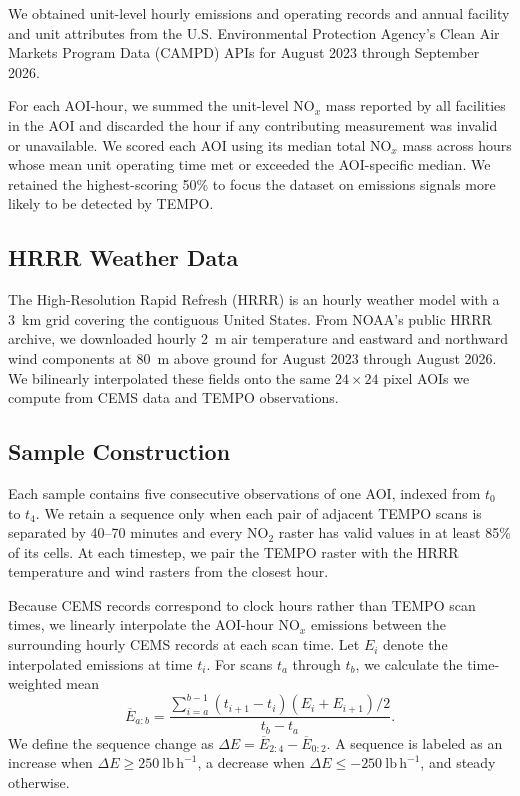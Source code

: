 \documentclass[sigconf,nonacm]{acmart}
\newcommand{\NOx}{NO$_x$}
\begin{document}
We obtained unit-level hourly emissions and operating records and annual
facility and unit attributes from the U.S. Environmental Protection Agency's
Clean Air Markets Program Data (CAMPD) APIs for August 2023 through September
2026.

For each AOI-hour, we summed the unit-level \NOx{} mass reported by all
facilities in the AOI and discarded the hour if any contributing measurement
was invalid or unavailable. We scored each AOI using its median total \NOx{}
mass across hours whose mean unit operating time met or exceeded the
AOI-specific median. We retained the highest-scoring 50\% to focus the dataset
on emissions signals more likely to be detected by TEMPO.

\subsection{HRRR Weather Data}

The High-Resolution Rapid Refresh (HRRR) is an hourly weather model with a
3~km grid covering the contiguous United States. From NOAA's public HRRR
archive, we downloaded hourly 2~m air temperature and eastward and northward
wind components at 80~m above ground for August 2023 through August 2026. We
bilinearly interpolated these fields onto the same $24 \times 24$ pixel AOIs
we compute from CEMS data and TEMPO observations.

\subsection{Sample Construction}

Each sample contains five consecutive observations of one AOI, indexed from
$t_0$ to $t_4$. We retain a sequence only when each pair of adjacent TEMPO
scans is separated by 40--70 minutes and every NO$_2$ raster has valid values
in at least 85\% of its cells. At each timestep, we pair the TEMPO raster with
the HRRR temperature and wind rasters from the closest hour.

Because CEMS records correspond to clock hours rather than TEMPO scan times,
we linearly interpolate the AOI-hour \NOx{} emissions between the surrounding
hourly CEMS records at each scan time. Let $E_i$ denote the interpolated emissions
at time $t_i$. For scans $t_a$ through $t_b$, we calculate the time-weighted mean
\begin{equation}
    \overline{E}_{a:b} =
    \frac{\sum_{i=a}^{b-1}(t_{i+1}-t_i)(E_i+E_{i+1})/2}
    {t_b-t_a}.
\end{equation}
We define the sequence change as
$\Delta E=\overline{E}_{2:4}-\overline{E}_{0:2}$. A sequence is labeled as an
increase when $\Delta E \geq 250~\mathrm{lb\,h^{-1}}$, a decrease when
$\Delta E \leq -250~\mathrm{lb\,h^{-1}}$, and steady otherwise.
\end{document}
